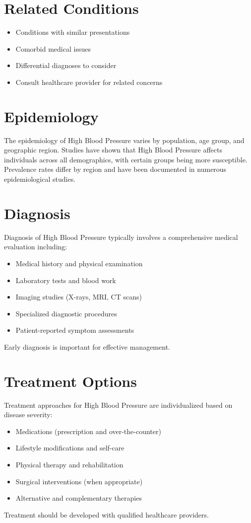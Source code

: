 \section*{Related Conditions}
\begin{itemize}
  \item Conditions with similar presentations
  \item Comorbid medical issues
  \item Differential diagnoses to consider
  \item Consult healthcare provider for related concerns
\end{itemize}

\section*{Epidemiology}
The epidemiology of High Blood Pressure varies by population, age group, and geographic region. Studies have shown that High Blood Pressure affects individuals across all demographics, with certain groups being more susceptible. Prevalence rates differ by region and have been documented in numerous epidemiological studies.

\section*{Diagnosis}
Diagnosis of High Blood Pressure typically involves a comprehensive medical evaluation including:
\begin{itemize}
  \item Medical history and physical examination
  \item Laboratory tests and blood work
  \item Imaging studies (X-rays, MRI, CT scans)
  \item Specialized diagnostic procedures
  \item Patient-reported symptom assessments
\end{itemize}
Early diagnosis is important for effective management.

\section*{Treatment Options}
Treatment approaches for High Blood Pressure are individualized based on disease severity:
\begin{itemize}
  \item Medications (prescription and over-the-counter)
  \item Lifestyle modifications and self-care
  \item Physical therapy and rehabilitation
  \item Surgical interventions (when appropriate)
  \item Alternative and complementary therapies
\end{itemize}
Treatment should be developed with qualified healthcare providers.

